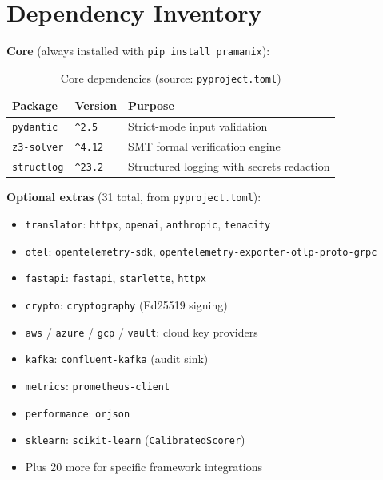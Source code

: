 \documentclass[12pt,a4paper,oneside]{report}
\newcommand{\fname}[1]{\texttt{#1}}          %
\newcommand{\code}[1]{\texttt{#1}}           %
\begin{document}
\chapter{Dependency Inventory}
\label{app:deps}

\textbf{Core} (always installed with \code{pip install pramanix}):

\begin{table}[h]
\centering
\begin{tabular}{@{} l l p{7cm} @{}}
\toprule
\textbf{Package} & \textbf{Version} & \textbf{Purpose} \\
\midrule
\code{pydantic}  & \code{\textasciicircum{}2.5}  & Strict-mode input validation \\
\code{z3-solver} & \code{\textasciicircum{}4.12} & SMT formal verification engine \\
\code{structlog} & \code{\textasciicircum{}23.2} & Structured logging with secrets redaction \\
\bottomrule
\end{tabular}
\caption{Core dependencies (source: \fname{pyproject.toml})}
\end{table}

\textbf{Optional extras} (31 total, from \fname{pyproject.toml}):

\begin{itemize}
  \item \code{translator}: \code{httpx}, \code{openai}, \code{anthropic},
        \code{tenacity}
  \item \code{otel}: \code{opentelemetry-sdk},
        \code{opentelemetry-exporter-otlp-proto-grpc}
  \item \code{fastapi}: \code{fastapi}, \code{starlette}, \code{httpx}
  \item \code{crypto}: \code{cryptography} (Ed25519 signing)
  \item \code{aws} / \code{azure} / \code{gcp} / \code{vault}: cloud key
        providers
  \item \code{kafka}: \code{confluent-kafka} (audit sink)
  \item \code{metrics}: \code{prometheus-client}
  \item \code{performance}: \code{orjson}
  \item \code{sklearn}: \code{scikit-learn} (\code{CalibratedScorer})
  \item Plus 20 more for specific framework integrations
\end{itemize}

\end{document}
